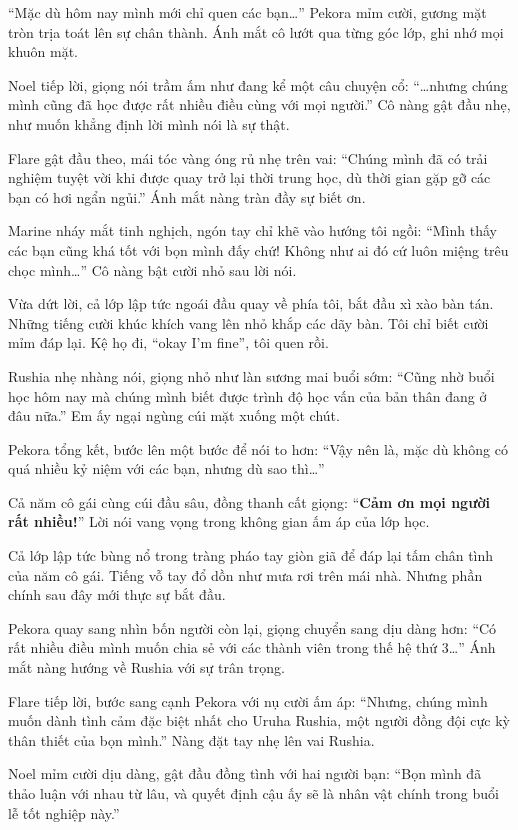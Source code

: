 \documentclass[../main.tex]{subfiles}
\begin{document}
``Mặc dù hôm nay mình mới chỉ quen các bạn\dots'' Pekora mỉm cười, gương mặt tròn trịa toát lên sự chân thành. Ánh mắt cô lướt qua từng góc lớp, ghi nhớ mọi khuôn mặt.

Noel tiếp lời, giọng nói trầm ấm như đang kể một câu chuyện cổ: ``\dots nhưng chúng mình cũng đã học được rất nhiều điều cùng với mọi người.'' Cô nàng gật đầu nhẹ, như muốn khẳng định lời mình nói là sự thật.

Flare gật đầu theo, mái tóc vàng óng rủ nhẹ trên vai: ``Chúng mình đã có trải nghiệm tuyệt vời khi được quay trở lại thời trung học, dù thời gian gặp gỡ các bạn có hơi ngẩn ngủi.'' Ánh mắt nàng tràn đầy sự biết ơn.

Marine nháy mắt tinh nghịch, ngón tay chỉ khẽ vào hướng tôi ngồi: ``Mình thấy các bạn cũng khá tốt với bọn mình đấy chứ! Không như ai đó cứ luôn miệng trêu chọc mình\dots'' Cô nàng bật cười nhỏ sau lời nói.

Vừa dứt lời, cả lớp lập tức ngoái đầu quay về phía tôi, bắt đầu xì xào bàn tán. Những tiếng cười khúc khích vang lên nhỏ khắp các dãy bàn. Tôi chỉ biết cười mỉm đáp lại. Kệ họ đi, ``okay I'm fine'', tôi quen rồi.

Rushia nhẹ nhàng nói, giọng nhỏ như làn sương mai buổi sớm: ``Cũng nhờ buổi học hôm nay mà chúng mình biết được trình độ học vấn của bản thân đang ở đâu nữa.'' Em ấy ngại ngùng cúi mặt xuống một chút.

Pekora tổng kết, bước lên một bước để nói to hơn: ``Vậy nên là, mặc dù không có quá nhiều kỷ niệm với các bạn, nhưng dù sao thì\dots''

Cả năm cô gái cùng cúi đầu sâu, đồng thanh cất giọng: ``\textbf{Cảm ơn mọi người rất nhiều!}'' Lời nói vang vọng trong không gian ấm áp của lớp học.

Cả lớp lập tức bùng nổ trong tràng pháo tay giòn giã để đáp lại tấm chân tình của năm cô gái. Tiếng vỗ tay đổ dồn như mưa rơi trên mái nhà. Nhưng phần chính sau đây mới thực sự bắt đầu.

Pekora quay sang nhìn bốn người còn lại, giọng chuyển sang dịu dàng hơn: ``Có rất nhiều điều mình muốn chia sẻ với các thành viên trong thế hệ thứ 3\dots'' Ánh mắt nàng hướng về Rushia với sự trân trọng.

Flare tiếp lời, bước sang cạnh Pekora với nụ cười ấm áp: ``Nhưng, chúng mình muốn dành tình cảm đặc biệt nhất cho Uruha Rushia, một người đồng đội cực kỳ thân thiết của bọn mình.'' Nàng đặt tay nhẹ lên vai Rushia.

Noel mỉm cười dịu dàng, gật đầu đồng tình với hai người bạn: ``Bọn mình đã thảo luận với nhau từ lâu, và quyết định cậu ấy sẽ là nhân vật chính trong buổi lễ tốt nghiệp này.''
\end{document}
